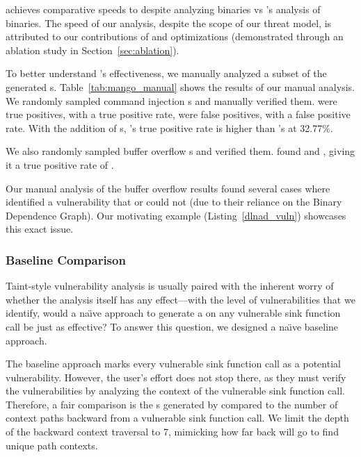 \toolname achieves comparative speeds to \satc despite analyzing \mangoKaronteBinaries binaries vs \satc's analysis of \satcAnalyzedBinaries binaries.
The speed of our analysis, despite the scope of our threat model, is attributed to our contributions of \assumed and \rev optimizations (demonstrated through an ablation study in Section~\ref{sec:ablation}).

To better understand \mango{}'s effectiveness, we manually analyzed a subset of the generated \trupoc{}s.
Table~\ref{tab:mango_manual} shows the results of our manual analysis.
We randomly sampled \manualAnalysisCmdInjTotal  \mango command injection \trupoc{}s and manually verified them.
\manualAnalysisCmdInjTrueTP were true positives, with a \manualAnalysisCmdInjTPRatio true positive rate, \manualAnalysisCmdInjTrueFP were false positives, with a \manualAnalysisCmdInjFPRatio false positive rate.
With the addition of \trupoc{}s, \mango's \manualAnalysisCmdInjTPRatio true positive rate is higher than \satc's at 32.77\%.

We also randomly sampled \manualAnalysisOverflowTotal \mango buffer overflow \trupoc{}s and verified them.
\mango found \manualAnalysisOverflowTrueTP and \manualAnalysisOverflowTrueFP, giving it a true positive rate of \manualAnalysisOverflowTPRatio.

Our manual analysis of the buffer overflow results found several cases where \mango identified a vulnerability that \karonte or \satc could not (due to their reliance on the Binary Dependence Graph).
Our motivating example (Listing~\ref{dlnad_vuln}) showcases this exact issue.

\subsubsection{Baseline Comparison}
\label{sec:baseline}


Taint-style vulnerability analysis is usually paired with the inherent worry of whether the analysis itself has any effect---with the level of vulnerabilities that we identify, would a na\"{\i}ve approach to generate a \trupoc on any vulnerable sink function call be just as effective?
To answer this question, we designed a na\"{\i}ve baseline approach.

The baseline approach marks every vulnerable sink function call as a potential vulnerability.
However, the user's effort does not stop there, as they must verify the vulnerabilities by analyzing the context of the vulnerable sink function call.
Therefore, a fair comparison is the \trupoc{}s generated by \mango compared to the number of context paths backward from a vulnerable sink function call.
We limit the depth of the backward context traversal to 7, mimicking how far back \mango will go to find unique path contexts.

